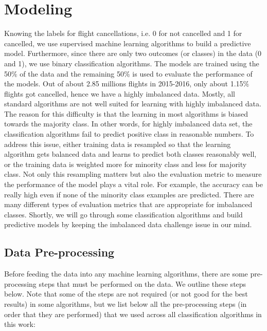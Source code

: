 \documentclass[12pt]{article}
\begin{document}
\section{Modeling}
\label{sec:models}
Knowing the labels for flight cancellations, i.e. 0 for not cancelled and 1 for cancelled, we use supervised machine learning algorithms to build a predictive model. Furthermore, since there are only two outcomes (or classes) in the data (0 and 1), we use binary classification algorithms. The models are trained using the 50$\%$ of the data and the remaining 50$\%$ is used to evaluate the performance of the models. Out of about 2.85 millions flights in 2015-2016, only about 1.15$\%$ flights got cancelled, hence we have a highly imbalanced data. Mostly, all standard algorithms are not well suited for learning with highly imbalanced data. The reason for this difficulty is that the learning in most algorithms is biased towards the majority class. In other words, for highly imbalanced data set, the classification algorithms fail to predict positive class in reasonable numbers. To address this issue, either training data is resampled so that the learning algorithm gets balanced data and learns to predict both classes reasonably well, or the training data is weighted more for minority class and less for majority class. Not only this resampling matters but also the evaluation metric to measure the performance of the model plays a vital role. For example, the accuracy can be really high even if none of the minority class examples are predicted. There are many different types of evaluation metrics that are appropriate for imbalanced classes. Shortly, we will go through some classification algorithms and build predictive models by keeping the imbalanced data challenge issue in our mind. 
\subsection{Data Pre-processing}
\label{sec:preproc}
Before feeding the data into any machine learning algorithms, there are some pre-processing steps that must be performed on the data. We outline these steps below. Note that some of the steps are not required (or not good for the best results) in some algorithms, but we list below all the pre-processing steps (in order that they are performed) that we used across all classification algorithms in this work:
\end{document}
